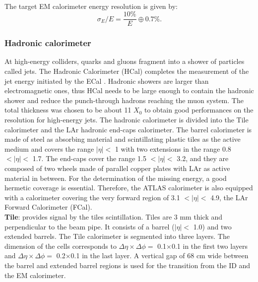 \\
The target EM calorimeter energy resolution is given by:
\begin{equation}
    \sigma_E/E = \frac{10\%}{E} \oplus 0.7\%.
\end{equation}

\subsubsection{Hadronic calorimeter}
\label{chap2:ATLAS:Calo:HCAL}
 At high-energy colliders, quarks and gluons fragment into a shower of particles called jets. The Hadronic Calorimeter (HCal) completes the measurement of the jet energy initiated by the ECal \cite{Tile_TDR}. Hadronic showers are larger than electromagnetic ones, thus HCal needs to be large enough to contain the hadronic shower and reduce the punch-through hadrons reaching the muon system. The total thickness was chosen to be about 11 $X_0$ to obtain good performances on the resolution for high-energy jets. The hadronic calorimeter is divided into the Tile calorimeter and the LAr hadronic end-caps calorimeter. The barrel calorimeter is made of steel as absorbing material and scintillating plastic tiles as the active medium and covers the range $|\eta| < $ 1 with two extensions in the range 0.8 $ < |\eta| < $ 1.7. The end-caps cover the range 1.5 $ < |\eta| < $ 3.2, and they are composed of two wheels made of parallel copper plates with LAr as active material in between. For the determination of the missing energy, a good hermetic coverage is essential. Therefore, the ATLAS calorimeter is also equipped with a calorimeter covering the very forward region of 3.1 $ < |\eta| < $ 4.9, the LAr Forward Calorimeter (FCal). \\
 
\textbf{Tile}: provides signal by the tiles scintillation. Tiles are 3 mm thick and perpendicular to the beam pipe. It consists of a barrel ($|\eta| < $ 1.0) and two extended barrels. The Tile calorimeter is segmented into three layers. The dimension of the cells corresponds to $\Delta\eta\times\Delta\phi=$ 0.1$\times$0.1 in the first two layers and $\Delta\eta\times\Delta\phi=$ 0.2$\times$0.1 in the last layer. A vertical gap of 68 cm wide between the barrel and extended barrel regions is used for the transition from the ID and the EM calorimeter. \\
 
